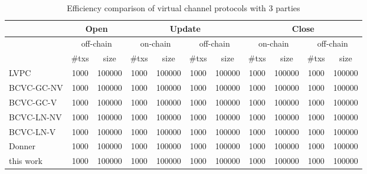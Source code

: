  \begin{table*}
    \caption{Efficiency comparison of virtual channel protocols with $3$
    parties}
    \label{table:comparison:overhead:3-parties}
    \begin{minipage}{\textwidth}
    \begin{center}
    \begin{tabular}{|l|c|c|c|c|c|c|c|c|c|c|}
    \hline
              & \multicolumn{2}{|c|}{Open} & \multicolumn{4}{|c|}{Update} &
              \multicolumn{4}{|c|}{Close} \\
    \hline
              & \multicolumn{2}{|c|}{off-chain} & \multicolumn{2}{|c|}{on-chain}
              & \multicolumn{2}{|c|}{off-chain} & \multicolumn{2}{|c|}{on-chain}
              & \multicolumn{2}{|c|}{off-chain} \\
    \hline
              & \#txs & size & \#txs & size & \#txs & size & \#txs & size &
              \#txs & size \\
    \hline
    LVPC       & 1000 & 100000 & 1000 & 100000 & 1000 & 100000 & 1000 & 100000 &
               1000 & 100000 \\
    \hline
    BCVC-GC-NV
              & 1000 & 100000 & 1000 & 100000 & 1000 & 100000 & 1000 & 100000 &
              1000 & 100000 \\
    \hline
    BCVC-GC-V & 1000 & 100000 & 1000 & 100000 & 1000 & 100000 & 1000 & 100000 &
              1000 & 100000 \\
    \hline
    BCVC-LN-NV
              & 1000 & 100000 & 1000 & 100000 & 1000 & 100000 & 1000 & 100000 &
              1000 & 100000 \\
    \hline
    BCVC-LN-V & 1000 & 100000 & 1000 & 100000 & 1000 & 100000 & 1000 & 100000 &
              1000 & 100000 \\
    \hline
    Donner    & 1000 & 100000 & 1000 & 100000 & 1000 & 100000 & 1000 & 100000 &
              1000 & 100000 \\
    \hline
    this work & 1000 & 100000 & 1000 & 100000 & 1000 & 100000 & 1000 & 100000 &
              1000 & 100000 \\
    \hline
    \end{tabular}
    \end{center}
    \end{minipage}
  \end{table*}

